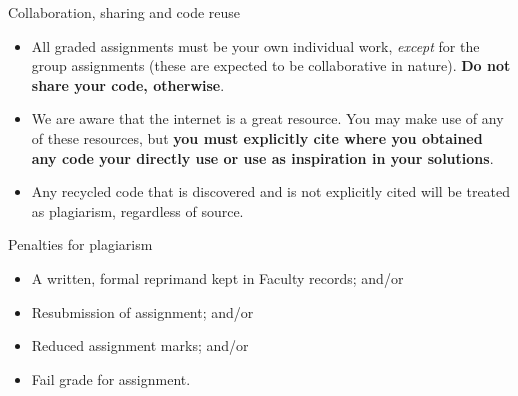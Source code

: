 \documentclass[,aspectratio=169]{beamer}
\providecommand{\tightlist}{%
  \setlength{\itemsep}{0pt}\setlength{\parskip}{0pt}}
\begin{document}
\begin{frame}{Collaboration, sharing and code reuse}
\protect\hypertarget{collaboration-sharing-and-code-reuse}{}
\begin{itemize}
\item
  All graded assignments must be your own individual work, \emph{except}
  for the group assignments (these are expected to be collaborative in
  nature). \textbf{Do not share your code, otherwise}.
\item
  We are aware that the internet is a great resource. You may make use
  of any of these resources, but \textbf{you must explicitly cite where
  you obtained any code your directly use or use as inspiration in your
  solutions}.
\item
  Any recycled code that is discovered and is not explicitly cited will
  be treated as plagiarism, regardless of source.
\end{itemize}

\pause

\begin{alertblock}{Penalties for plagiarism}

\begin{itemize}
\tightlist
\item
  A written, formal reprimand kept in Faculty records; and/or
\item
  Resubmission of assignment; and/or
\item
  Reduced assignment marks; and/or
\item
  Fail grade for assignment.
\end{itemize}

\end{alertblock}
\end{frame}
\end{document}
